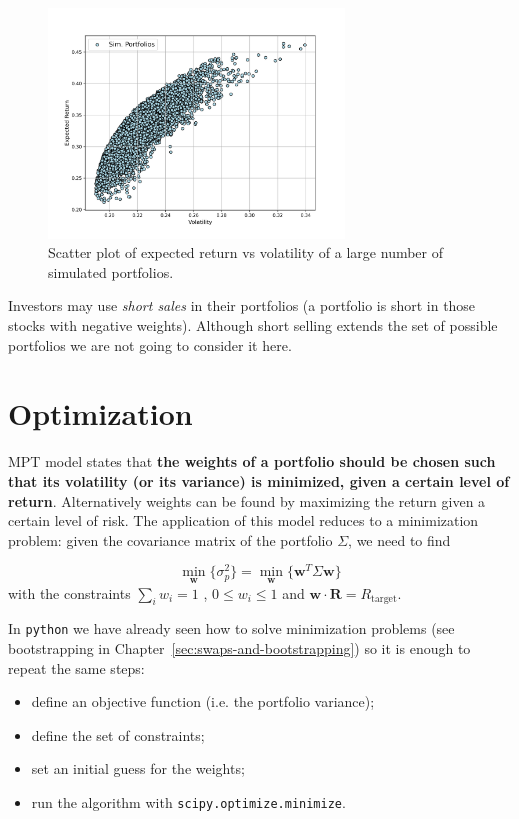 \begin{figure}[hbtp]
\centering
\includegraphics[width=0.7\textwidth]{figures/return_variance}
\caption{Scatter plot of expected return vs volatility of a large number of simulated portfolios.}
\label{fig:mc_portfolio}
\end{figure}

Investors may use \emph{short sales} in their portfolios (a portfolio is short in those stocks with negative weights). 
Although short selling extends the set of possible portfolios we are not going to consider it here.

\section{Optimization}\label{optimization}

MPT model states that \textbf{the weights of a portfolio should be chosen such that its volatility (or its variance) is minimized, given a certain level of return}. Alternatively weights can be found by maximizing the return given a certain level of risk. 
The application of this model reduces to a minimization problem: given the covariance matrix of the portfolio $\Sigma$, we need to find

\begin{equation}
\underset{\mathbf{w}}{\min}\{\sigma_p^2\} = \underset{\mathbf{w}}{\min}\{\mathbf{w}^T\Sigma\mathbf{w}\}
\end{equation}
with the constraints $\sum_{i}w_i = 1$ , $0 \le w_i \le 1$ and $\mathbf{w}\cdot\mathbf{R}=R_{\textrm{target}}$.

In \texttt{python} we have already seen how to solve minimization problems (see bootstrapping in Chapter~\ref{sec:swaps-and-bootstrapping}) so it is enough to repeat the same steps:

\begin{itemize}
\tightlist
\item define an objective function (i.e. the portfolio variance);
\item define the set of constraints;
\item set an initial guess for the weights;
\item run the algorithm with \texttt{scipy.optimize.minimize}.
\end{itemize}

